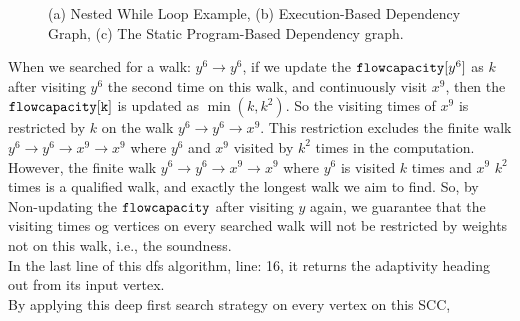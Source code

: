 \begin{figure}
{\begin{subfigure}{.42\textwidth}
\begin{centering}
   \caption{}
      \end{centering}
      \end{subfigure}
    }
    \vspace{-0.4cm}
     \caption{(a) Nested While Loop Example, (b) Execution-Based Dependency Graph, (c) The Static Program-Based Dependency graph.}
    \label{fig:alg_adaptsearch_nestedwhile}
    \vspace{-0.5cm}
    \end{figure}
    When we searched for a walk: $y^6 \to y^6$,
  if we update the $\mathtt{flowcapacity}[y^6]$ as $k$ after visiting $y^6$ the second time 
  on this walk,
  and continuously visit $x^9$,
  then the $\mathtt{flowcapacity[k]}$ is 
  updated as $\min(k, k^2)$.
  So
  the visiting times of $x^9$ is restricted by $k$ on the walk $y^6 \to y^6 \to x^9$.
  This restriction excludes the finite walk $y^6 \to y^6 \to x^9 \to x^9$ where $y^6$ and $x^9$ visited by $k^2$ times
  in the computation. 
  However, the finite walk $y^6 \to y^6 \to x^9 \to x^9$ where $y^6$ is visited $k$ times and $x^9$ $k^2$ times is 
  a qualified walk, and exactly the longest walk we aim to find. So, by Non-updating the $\mathtt{flowcapacity}$ after 
  visiting $y$ again, we guarantee that the visiting times og vertices on every searched walk will not be restricted by weights not on this walk,
  i.e., the soundness.
 \\
In the last line of this dfs algorithm, line: 16, it returns the adaptivity heading out from its input vertex.
\\
By applying this deep first search strategy on every vertex on this SCC, 
